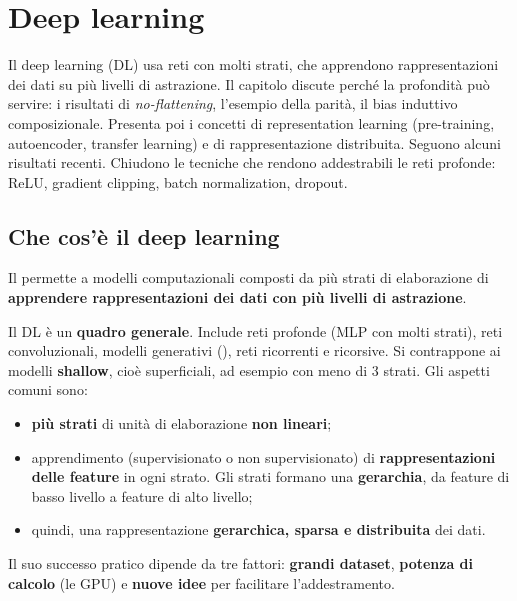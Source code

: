 \chapter{Deep learning}
\label{cap:deep}

\begin{inbreve}
Il deep learning (DL) usa reti con molti strati, che apprendono rappresentazioni dei dati su più livelli di
astrazione. Il capitolo discute perché la profondità può servire: i risultati di \emph{no-flattening}, l'esempio
della parità, il bias induttivo composizionale. Presenta poi i concetti di representation learning (pre-training,
autoencoder, transfer learning) e di rappresentazione distribuita. Seguono alcuni risultati recenti. Chiudono le
tecniche che rendono addestrabili le reti profonde: ReLU, gradient clipping, batch normalization, dropout.
\end{inbreve}

\section{Che cos'è il deep learning}

\begin{definizione}
Il  permette a modelli computazionali composti da più strati di elaborazione di
\textbf{apprendere rappresentazioni dei dati con più livelli di astrazione}.
\end{definizione}

Il DL è un \textbf{quadro generale}. Include reti profonde (MLP con molti strati), reti convoluzionali, modelli
generativi (), reti ricorrenti e ricorsive. Si contrappone ai modelli \textbf{shallow},
cioè superficiali, ad esempio con meno di 3 strati. Gli aspetti comuni sono:
\begin{itemize}
  \item \textbf{più strati} di unità di elaborazione \textbf{non lineari};
  \item apprendimento (supervisionato o non supervisionato) di \textbf{rappresentazioni delle feature} in ogni
        strato. Gli strati formano una \textbf{gerarchia}, da feature di basso livello a feature di alto livello;
  \item quindi, una rappresentazione \textbf{gerarchica, sparsa e distribuita} dei dati.
\end{itemize}
Il suo successo pratico dipende da tre fattori: \textbf{grandi dataset}, \textbf{potenza di calcolo} (le GPU) e
\textbf{nuove idee} per facilitare l'addestramento.

